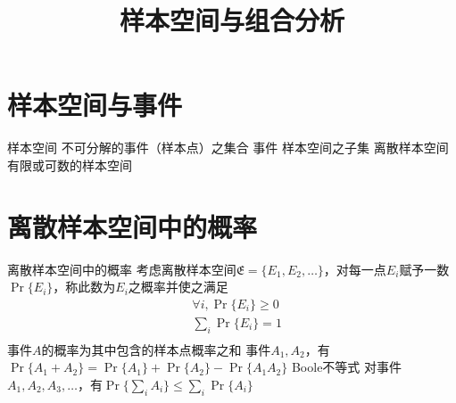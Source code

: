 \documentclass[11pt]{article}
\title{样本空间与组合分析}
\author{}
\date{}
\begin{document}
\begin{sloppypar}
  \maketitle

  \linenumbers
\section{样本空间与事件}
样本空间 \newline
不可分解的事件（样本点）之集合 \newline
\newline
事件 \newline
样本空间之子集 \newline
\newline
离散样本空间 \newline
有限或可数的样本空间 \newline

\section{离散样本空间中的概率}
离散样本空间中的概率 \newline
考虑离散样本空间$\mathfrak{E} = \{E_1,E_2,\dots\}$，对每一点$E_i$赋予一数$\Pr\{E_i\}$，称此数为$E_i$之概率并使之满足
\begin{equation}
\begin{align}
    & \forall i, \Pr\{E_i\} \ge 0 \\
    & \sum_i \Pr\{E_i\} = 1 \\
\end{align}
\end{equation}
\newline
事件$A$的概率为其中包含的样本点概率之和 \newline
\newline
事件$A_1,A_2$，有$\Pr\{A_1+A_2\} = \Pr\{A_1\} + \Pr\{A_2\} - \Pr\{A_1A_2\}$ \newline
\newline
Boole不等式 \newline
对事件$A_1,A_2,A_3,\dots$，有$\Pr\{\sum_i A_i\} \le \sum_i \Pr\{A_i\}$ \newline


\end{sloppypar}
\end{document}
